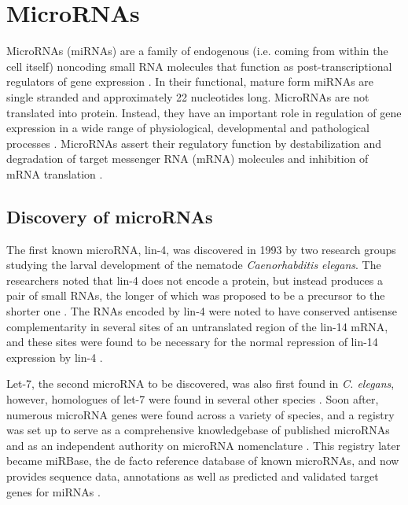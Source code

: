 \section{MicroRNAs}\label{micrornas}

MicroRNAs (miRNAs) are a family of endogenous (i.e. coming from within the
cell itself) noncoding small RNA molecules that function as post-transcriptional
regulators of gene expression \citep{Ambros2004}. In their
functional, mature form miRNAs are single stranded and approximately 22
nucleotides long. MicroRNAs are not translated into protein. Instead, they
have an important role in regulation of gene expression in a wide range of
physiological, developmental and pathological processes \citep{Bartel2009}.
MicroRNAs assert their regulatory function by destabilization and degradation
of target messenger RNA (mRNA) molecules and inhibition of mRNA translation
\citep{Fabian2010}.




\subsection{Discovery of microRNAs}

The first known microRNA, lin-4, was discovered in 1993 by two research groups
studying the larval development of the nematode \emph{Caenorhabditis elegans}.
The researchers noted that lin-4 does not encode a protein, but instead
produces a pair of small RNAs, the longer of which was proposed to be a
precursor to the shorter one \citep{Lee1993}. The RNAs encoded by lin-4 were
noted to have conserved antisense complementarity in several sites of an
untranslated region of the lin-14 mRNA, and these sites were found to be
necessary for the normal repression of lin-14 expression by lin-4
\citep{Lee1993,Wightman1993}.

Let-7, the second microRNA to be discovered, was also first found in \emph{C.
elegans}, however, homologues of let-7 were found in several other species
\citep{Pasquinelli2000}. Soon after, numerous microRNA genes were found across
a variety of species, and a registry was set up to serve as a comprehensive
knowledgebase of published microRNAs and as an independent authority on
microRNA nomenclature \citep{GriffithsJones2004}. This registry later became
miRBase, the de facto reference database of known microRNAs, and now provides
sequence data, annotations as well as predicted and validated target genes for
miRNAs \citep{Kozomara2014}.

